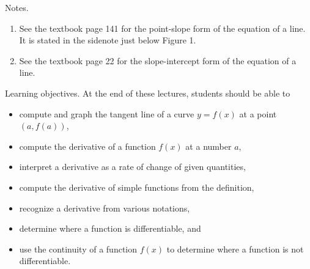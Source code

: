 \documentclass[../main]{subfiles}
\begin{document}
%
%
Notes.
  \begin{enumerate}
    \item See the textbook page 141 for the point-slope form of the equation of a line. It is stated in the sidenote just below Figure 1.
    \item See the textbook page 22 for the slope-intercept form of the equation of a line.
  \end{enumerate}
%
% 

%
%
Learning objectives.
  At the end of these lectures, students should be able to
  \begin{itemize}
    \item compute and graph the tangent line of a curve \(y = f(x)\) at a point \((a, f(a))\),
    \item compute the derivative of a function \(f(x)\) at a number \(a\),
    \item interpret a derivative as a rate of change of given quantities,
    \item compute the derivative of simple functions from the definition,
    \item recognize a derivative from various notations,
    \item determine where a function is differentiable, and
    \item use the continuity of a function \(f(x)\) to determine where a function is not differentiable.
  \end{itemize}
\end{document}
